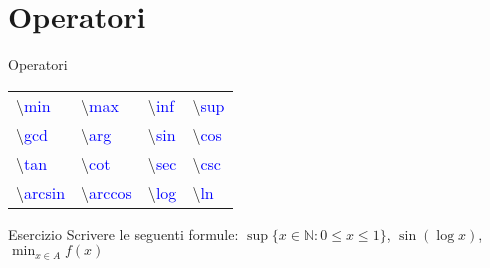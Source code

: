 \section{Operatori}
  \begin{frame}{Operatori}

	\begin{table}[h!]
	\begin{tabular}{p{2.3cm} p{2.3cm} p{2.3cm} p{2.3cm}}
	\hline
	\textbackslash \textcolor{blue}{min} & \textbackslash \textcolor{blue}{max} & \textbackslash \textcolor{blue}{inf} & \textbackslash \textcolor{blue}{sup} \\[0.4cm]
	\textbackslash \textcolor{blue}{gcd} & \textbackslash \textcolor{blue}{arg} & \textbackslash \textcolor{blue}{sin} & \textbackslash \textcolor{blue}{cos} \\[0.4cm]
	\textbackslash \textcolor{blue}{tan} & \textbackslash \textcolor{blue}{cot} & \textbackslash \textcolor{blue}{sec} & \textbackslash \textcolor{blue}{csc} \\[0.4cm]
	\textbackslash \textcolor{blue}{arcsin} & \textbackslash \textcolor{blue}{arccos} & \textbackslash \textcolor{blue}{log} & \textbackslash \textcolor{blue}{ln} \\
	\hline
	\end{tabular}
	\end{table}

	\begin{block}{Esercizio}
	Scrivere le seguenti formule: $\sup \{ x \in \mathbb{N} : 0 \leq x \leq 1 \} $, $\sin (\log x)$, $\min_{x\in A} f(x)$
	\end{block}

\end{frame}
